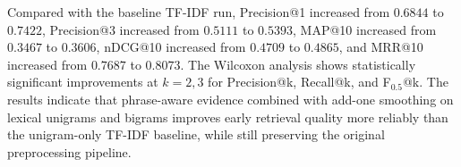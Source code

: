 Compared with the baseline TF-IDF run, Precision@1 increased from $0.6844$ to $0.7422$, Precision@3 increased from $0.5111$ to $0.5393$, MAP@10 increased from $0.3467$ to $0.3606$, nDCG@10 increased from $0.4709$ to $0.4865$, and MRR@10 increased from $0.7687$ to $0.8073$.
The Wilcoxon analysis shows statistically significant improvements at $k=2, 3$ for Precision@k, Recall@k, and F$_{0.5}$@k.
The results indicate that phrase-aware evidence combined with add-one smoothing on lexical unigrams and bigrams improves early retrieval quality more reliably than the unigram-only TF-IDF baseline, while still preserving the original preprocessing pipeline.